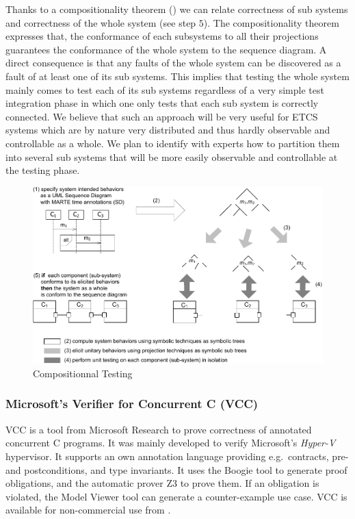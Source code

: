 \documentclass{template/openetcs_report}
\begin{document}
Thanks to a compositionality theorem (\cite{bannour2012}) we can relate correctness of sub systems and correctness of the whole system (see step $5$).
The compositionality theorem expresses that, the conformance of each subsystems to all their projections guarantees the conformance of the whole system to the sequence diagram. A direct consequence is that any faults of the whole system can be discovered as a fault of at least one of its sub systems. This implies that testing the whole system mainly comes to test each of its sub systems regardless of a very simple test integration phase in which one only tests that each sub system is correctly connected. We believe that such an approach will be very useful for ETCS systems which are by nature very distributed and thus hardly observable and controllable as a whole. We plan to identify with experts how to partition them into several sub systems that will be more easily observable and controllable at the testing phase.  


\begin{figure}
\centering
\includegraphics[scale=0.525]{approach_3.pdf}
\caption{\label{ct}Compositionnal Testing}
\end{figure}








\subsubsection{Microsoft's Verifier for Concurrent C (VCC)}

VCC is a tool from Microsoft Research
to prove correctness of annotated concurrent C programs.
It was mainly developed to verify Microsoft's \emph{Hyper-V} hypervisor.
%
It supports an own annotation language providing
e.g.\ contracts, pre- and postconditions, and type invariants.
%
It uses the Boogie tool to generate proof obligations,
and the automatic prover Z3 to prove them.
%
If an obligation is violated, the Model Viewer tool can generate a
counter-example use case.
%
VCC is available for non-commercial use from \cite{vcc}.
\end{document}
